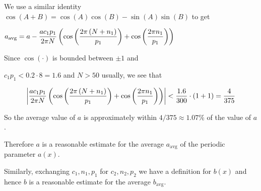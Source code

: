 \begin{prop}
\begin{pf}
We use a similar identity $\cos(A+B) = \cos(A)\cos(B) - \sin(A)\sin(B)$ to get

$\begin{aligned}
a_{\text{avg}} 
&= a 
-\frac{ac_1 p_1}{2\pi N} \left(\cos\left(\frac{2\pi \left(N+n_1\right)}{p_1}\right)
+\cos\left(\frac{2\pi n_1}{p_1}\right)\right)
\end{aligned}$

Since $\cos(\cdot)$ is bounded between $\pm 1$ and

$c_1 p_1<0.2\cdot 8 = 1.6$ and $N>50$ usually, we see that

$$\left|\frac{ac_1 p_1}{2\pi N} \left(\cos\left(\frac{2\pi \left(N+n_1\right)}{p_1}\right)
+\cos\left(\frac{2\pi n_1}{p_1}\right)\right)\right| < \frac{1.6}{300} \cdot \left(1+1\right)=\frac{4}{375}$$


So the average value of $a$ is approximately within $4/375 \approx 1.07\%$ of the value of $a$.

Therefore $a$ is a reasonable estimate for the average $a_{\text{avg}}$ of the periodic parameter $a(x)$.

Similarly, exchanging $c_1,n_1,p_1$ for $c_2,n_2,p_2$ we have a definition for $b(x)$ and hence $b$ is a reasonable estimate for the average $b_{\text{avg}}$.

\end{pf}
\end{prop}

